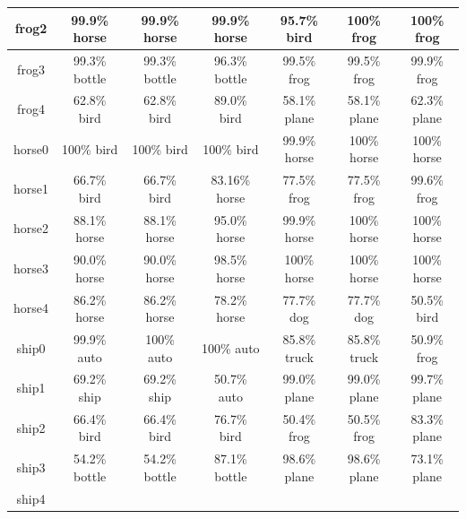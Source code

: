 \begin{longtable}{| c | c | c | c | c | c | c |}
 \hline
frog2 \cellcolor{light-gray}	
& 99.9\% horse		
& 99.9\% horse 	
& 99.9\% horse 	
&  95.7\% bird	 
& 100\% frog\cellcolor{green} 	
& 100\% frog\cellcolor{green}\\
 \hline
frog3 \cellcolor{light-gray}	
& 99.3\% bottle		
& 99.3\% bottle 	
& 96.3\% bottle 	
&  99.5\% frog\cellcolor{green}	 
& 99.5\% frog\cellcolor{green} 	
& 99.9\% frog\cellcolor{green}\\
 \hline
frog4 \cellcolor{light-gray}	
& 62.8\% bird		
& 62.8\% bird 	
& 89.0\% bird 	
&  58.1\% plane
& 58.1\% plane
 & 62.3\% plane\\
 \hline
horse0 \cellcolor{light-gray} 	
& 100\% bird		
& 100\% bird 	
& 100\% bird 	
&  99.9\% horse\cellcolor{green}	 
& 100\% horse\cellcolor{green} 	
& 100\% horse\cellcolor{green}\\
 \hline
horse1 \cellcolor{light-gray}	
& 66.7\% bird		
& 66.7\% bird 	
& 83.16\% horse\cellcolor{green} 
&  77.5\% frog	 
& 77.5\% frog 	
& 99.6\% frog\\
 \hline
horse2 \cellcolor{light-gray}	
& 88.1\% horse\cellcolor{green}		
& 88.1\% horse\cellcolor{green} 	
& 95.0\% horse\cellcolor{green} 	
&  99.9\% horse\cellcolor{green}	
 & 100\% horse\cellcolor{green} 	
 & 100\% horse\cellcolor{green}\\
 \hline
horse3 \cellcolor{light-gray}	
& 90.0\% horse\cellcolor{green}		
& 90.0\% horse\cellcolor{green} 	
& 98.5\% horse\cellcolor{green} 	
&  100\% horse\cellcolor{green}	
 & 100\% horse\cellcolor{green} 	
 & 100\% horse\cellcolor{green}\\
 \hline
horse4 \cellcolor{light-gray}	
& 86.2\% horse\cellcolor{green}		
& 86.2\% horse\cellcolor{green} 	
& 78.2\% horse\cellcolor{green} 	
&  77.7\% dog	 
& 77.7\% dog 	
& 50.5\% bird\\
 \hline
ship0 \cellcolor{light-gray}	
& 99.9\% auto		
& 100\% auto 	
& 100\% auto 	
&  85.8\% truck	 
& 85.8\% truck 	
& 50.9\% frog\\
 \hline
ship1 \cellcolor{light-gray}	
& 69.2\% ship\cellcolor{green}		
& 69.2\% ship\cellcolor{green} 	
& 50.7\% auto 	
&  99.0\% plane& 99.0\% plane 	
& 99.7\% plane\\
 \hline
ship2 \cellcolor{light-gray}	
& 66.4\% bird		
& 66.4\% bird 	
& 76.7\% bird 	
&  50.4\% frog	 
 & 50.5\% frog 	
 & 83.3\% plane\\
 \hline
ship3 \cellcolor{light-gray}	
& 54.2\% bottle		
& 54.2\% bottle 	
& 87.1\% bottle 
&  98.6\% plane 
& 98.6\% plane 
& 73.1\% plane\\
 \hline
ship4 \cellcolor{light-gray}	

\end{longtable}
